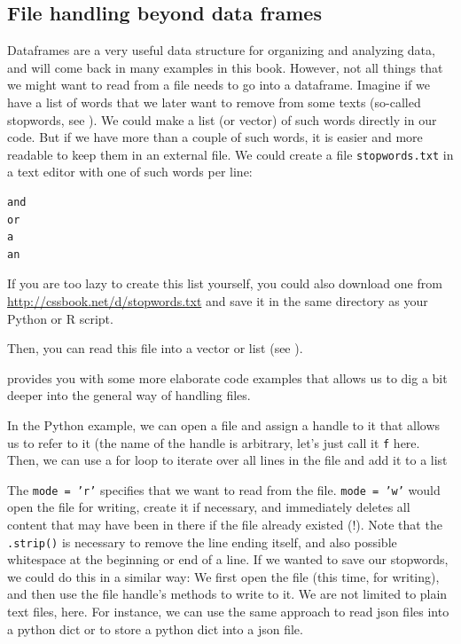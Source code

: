 \subsection{File handling beyond data frames}
Dataframes are a very useful data structure for organizing and analyzing data, and will come back in many examples in this book.
However, not all things that we might want to read from a file needs to go into a dataframe.
Imagine if we have a list of words that we later want to remove from some texts (so-called stopwords, see ).
We could make a list (or vector) of such words directly in our code. 
But if we have more than a couple of such words, it is easier and more readable to keep them in an external file. We could create a file \texttt{stopwords.txt} in a text editor with one of such words per line:

\begin{lstlisting}
and
or
a
an
\end{lstlisting}

If you are too lazy to create this list yourself, you could also
download one from \url{http://cssbook.net/d/stopwords.txt} and save it
in the same directory as your Python or R script.

Then, you can read this file into a vector or list  (see ).



 provides you with some more elaborate code examples that allows us to dig a bit deeper into the general way of handling files.

In the Python example,  we can open a file and assign a handle to it that allows us to refer to it (the name of the handle is arbitrary, let's just call it \texttt{f} here.
Then, we can use a for loop to iterate over all lines in the file and add it to a list

The \texttt{mode = 'r'} specifies that we want to read from the file. \texttt{mode = 'w'} would open the file for writing, create it if necessary, and immediately deletes all content that may have been in there if the file already existed (!).
Note that the \texttt{.strip()} is necessary to remove the line ending itself, and also possible whitespace at the beginning or end of a line.
If we wanted to save our stopwords, we could do this in a similar way: We first open the file (this time, for writing), and then use the file handle's methods to write to it.
We are not limited to plain text files, here. For instance, we can use the same approach to read json files into a python dict or to store a python dict into a json file.


